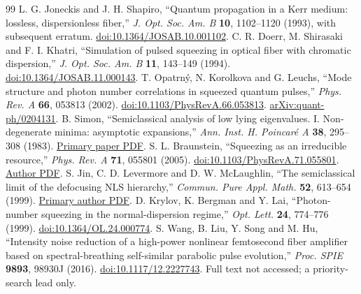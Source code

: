 \documentclass[11pt,a4paper]{article}
\newcommand{\doi}[1]{\href{https://doi.org/#1}{doi:#1}}
\begin{document}
\begin{thebibliography}{99}
 L. G. Joneckis and J. H. Shapiro, ``Quantum propagation in a Kerr medium: lossless, dispersionless fiber,'' \emph{J. Opt. Soc. Am. B} \textbf{10}, 1102--1120 (1993), with subsequent erratum. \doi{10.1364/JOSAB.10.001102}.
 C. R. Doerr, M. Shirasaki and F. I. Khatri, ``Simulation of pulsed squeezing in optical fiber with chromatic dispersion,'' \emph{J. Opt. Soc. Am. B} \textbf{11}, 143--149 (1994). \doi{10.1364/JOSAB.11.000143}.
 T. Opatrn\'y, N. Korolkova and G. Leuchs, ``Mode structure and photon number correlations in squeezed quantum pulses,'' \emph{Phys. Rev. A} \textbf{66}, 053813 (2002). \doi{10.1103/PhysRevA.66.053813}. \href{https://arxiv.org/abs/quant-ph/0204131}{arXiv:quant-ph/0204131}.
 B. Simon, ``Semiclassical analysis of low lying eigenvalues. I. Non-degenerate minima: asymptotic expansions,'' \emph{Ann. Inst. H. Poincar\'e A} \textbf{38}, 295--308 (1983). \href{https://www.numdam.org/item/AIHPA_1983__38_3_295_0.pdf}{Primary paper PDF}.
 S. L. Braunstein, ``Squeezing as an irreducible resource,'' \emph{Phys. Rev. A} \textbf{71}, 055801 (2005). \doi{10.1103/PhysRevA.71.055801}. \href{https://www-users.york.ac.uk/~sb54/papers/b05B.pdf}{Author PDF}.
 S. Jin, C. D. Levermore and D. W. McLaughlin, ``The semiclassical limit of the defocusing NLS hierarchy,'' \emph{Commun. Pure Appl. Math.} \textbf{52}, 613--654 (1999). \href{https://math.nyu.edu/~dmac/docs/DWM-31.pdf}{Primary author PDF}.
 D. Krylov, K. Bergman and Y. Lai, ``Photon-number squeezing in the normal-dispersion regime,'' \emph{Opt. Lett.} \textbf{24}, 774--776 (1999). \doi{10.1364/OL.24.000774}.
 S. Wang, B. Liu, Y. Song and M. Hu, ``Intensity noise reduction of a high-power nonlinear femtosecond fiber amplifier based on spectral-breathing self-similar parabolic pulse evolution,'' \emph{Proc. SPIE} \textbf{9893}, 98930J (2016). \doi{10.1117/12.2227743}. Full text not accessed; a priority-search lead only.
\end{thebibliography}
\end{document}
